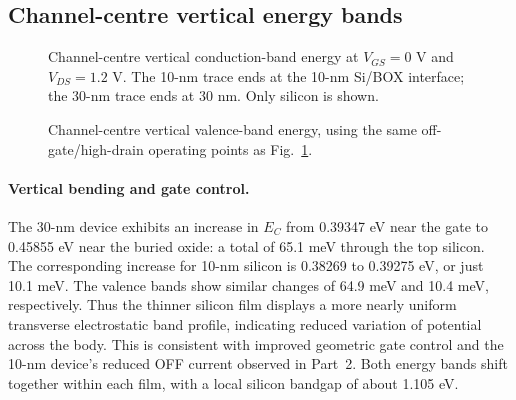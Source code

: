 \subsection{Channel-centre vertical energy bands}
\begin{figure}[H]\centering
{}
\caption{Channel-centre vertical conduction-band energy
at $V_{GS}=0$ V and $V_{DS}=1.2$ V.
The 10-nm trace ends at the 10-nm Si/BOX interface;
the 30-nm trace ends at 30 nm. Only silicon is shown.}
\label{fig:part5_vert_ec}
\end{figure}

\begin{figure}[H]\centering
{}
\caption{Channel-centre vertical valence-band energy,
using the same off-gate/high-drain operating points
as Fig.~\ref{fig:part5_vert_ec}.}
\label{fig:part5_vert_ev}
\end{figure}

\paragraph{Vertical bending and gate control.}
The 30-nm device exhibits an increase in
$E_C$ from 0.39347 eV near the gate to
0.45855 eV near the buried oxide:
a total of 65.1 meV through the top
silicon. The corresponding increase for
10-nm silicon is 0.38269 to 0.39275 eV,
or just 10.1 meV.
The valence bands show similar changes
of 64.9 meV and 10.4 meV, respectively.
Thus the thinner silicon film displays a more
nearly uniform transverse electrostatic band
profile, indicating reduced variation of
potential across the body. This is consistent
with improved geometric gate control and
the 10-nm device's reduced OFF current
observed in Part~2. Both energy bands
shift together within each film, with a local
silicon bandgap of about 1.105 eV.

